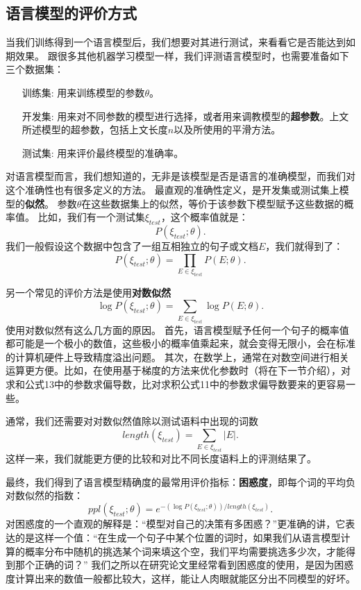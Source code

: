 \documentclass[10pt,a4paper]{ctexart}
\begin{document}
\subsection{语言模型的评价方式}
当我们训练得到一个语言模型后，我们想要对其进行测试，来看看它是否能达到如期效果。
跟很多其他机器学习模型一样，我们评测语言模型时，也需要准备如下三个数据集：
\begin{enumerate}
\item[训练集:] 用来训练模型的参数$\theta$。
\item[开发集:] 用来对不同参数的模型进行选择，或者用来调教模型的\textbf{超参数}。上文所述模型的超参数，包括上文长度$n$以及所使用的平滑方法。
\item[测试集:] 用来评价最终模型的准确率。
\end{enumerate}

对语言模型而言，我们想知道的，无非是该模型是否是语言的准确模型，而我们对这个准确性也有很多定义的方法。
最直观的准确性定义，是开发集或测试集上模型的\textbf{似然}。
参数$\theta$在这些数据集上的似然，等价于该参数下模型赋予这些数据的概率值。
比如，我们有一个测试集$\xi_{test}$，这个概率值就是：
\[
 P(\xi_{test};\theta).
\]
我们一般假设这个数据中包含了一组互相独立的句子或文档$E$，我们就得到了：
\[
 P(\xi_{test};\theta) = \prod_{E \in \xi_{test}} P(E;\theta).
\]

另一个常见的评价方法是使用\textbf{对数似然}
\[
 \log P(\xi_{test};\theta) = \sum_{E \in \xi_{test}} \log P(E;\theta).
\]
使用对数似然有这么几方面的原因。
首先，语言模型赋予任何一个句子的概率值都可能是一个极小的数值，这些极小的概率值乘起来，就会变得无限小，会在标准的计算机硬件上导致精度溢出问题。
其次，在数学上，通常在对数空间进行相关运算更方便。比如，在使用基于梯度的方法来优化参数时（将在下一节介绍），对求和公式13中的参数求偏导数，比对求积公式11中的参数求偏导数要来的更容易一些。

通常，我们还需要对对数似然值除以测试语料中出现的词数
\[
 length(\xi_{test}) = \sum_{E \in \xi_{test}} |E|.
\]
这样一来，我们就能更方便的比较和对比不同长度语料上的评测结果了。

最终，我们得到了语言模型精确度的最常用评价指标：\textbf{困惑度}，即每个词的平均负对数似然的指数：
\[
 ppl(\xi_{test};\theta) = e^{-(\log P(\xi_{test};\theta))/length(\xi_{test})}.
\]
对困惑度的一个直观的解释是：“模型对自己的决策有多困惑？”更准确的讲，它表达的是这样一个值：“在生成一个句子中某个位置的词时，如果我们从语言模型计算的概率分布中随机的挑选某个词来填这个空，我们平均需要挑选多少次，才能得到那个正确的词？”
我们之所以在研究论文里经常看到困惑度的使用，是因为困惑度计算出来的数值一般都比较大，这样，能让人肉眼就能区分出不同模型的好坏。
\end{document}
